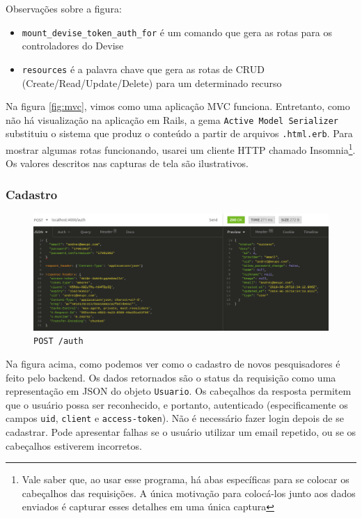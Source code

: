 Observações sobre a figura:
\begin{itemize}
    \item \texttt{mount\_devise\_token\_auth\_for} é um comando que gera as rotas para os controladores do Devise
    \item \texttt{resources} é a palavra chave que gera as rotas de CRUD (Create/Read/Update/Delete) para um determinado
    recurso
\end{itemize}

Na figura \ref{fig:mvc}, vimos como uma aplicação MVC funciona. Entretanto, como não há visualização na aplicação em Rails,
a gema \texttt{Active Model Serializer} substituiu o sistema que produz o conteúdo a partir de arquivos \texttt{.html.erb}.
Para mostrar algumas rotas funcionando, usarei um cliente HTTP chamado Insomnia\footnote{Vale saber que, ao usar esse
programa, há abas específicas para se colocar os cabeçalhos das requisições. A única motivação para colocá-los junto aos
dados enviados é capturar esses detalhes em uma única captura}. Os valores descritos nas capturas de tela são ilustrativos.

\subsubsection{Cadastro}

\begin{figure}[ht]
    \centering
    \includegraphics[width=.75\textwidth]{figuras/sign-up.png}
    \caption{\texttt{POST /auth}}
    \label{fig:sign-up}
\end{figure}

Na figura acima, como podemos ver como o cadastro de novos pesquisadores é feito pelo backend. Os dados retornados são
o status da requisição como uma representação em JSON do objeto \texttt{Usuario}. Os cabeçalhos da resposta permitem que
o usuário possa ser reconhecido, e portanto, autenticado (especificamente os campos \texttt{uid}, \texttt{client} e
\texttt{access-token}). Não é necessário fazer login depois de se cadastrar. Pode apresentar falhas se o usuário utilizar
um email repetido, ou se os cabeçalhos estiverem incorretos.

